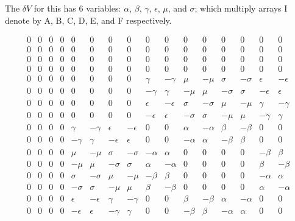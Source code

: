 \documentclass[12pt]{article}
\begin{document}
 The $\delta V$ for this has 6 variables: $\alpha$, $\beta$, $\gamma$,
$\epsilon$, $\mu$, and $\sigma$; which multiply arrays I denote by
A, B, C, D, E, and F respectively.


\begin{displaymath}
\begin{array}{cccccccccccccccc}
0 &0 &0 &0 &0 &0 &0 &0 &0 &0 &0 &0 &0 &0 &0 &0 \\
0 &0 &0 &0 &0 &0 &0 &0 &0 &0 &0 &0 &0 &0 &0 &0 \\
0 &0 &0 &0 &0 &0 &0 &0 &0 &0 &0 &0 &0 &0 &0 &0 \\
0 &0 &0 &0 &0 &0 &0 &0 &0 &0 &0 &0 &0 &0 &0 &0 \\
0 &0 &0 &0 &0 &0 &0 &0 & \gamma &-\gamma &\mu &-\mu &\sigma &-\sigma &\epsilon &-\epsilon \\
0 &0 &0 &0 &0 &0 &0 &0 & -\gamma &\gamma &-\mu &\mu &-\sigma &\sigma &-\epsilon &\epsilon \\
0 &0 &0 &0 &0 &0 &0 &0 &\epsilon &-\epsilon &\sigma &-\sigma &\mu &-\mu &\gamma &-\gamma \\
0 &0 &0 &0 &0 &0 &0 &0 &-\epsilon &\epsilon &-\sigma &\sigma &-\mu &\mu &-\gamma &\gamma \\
0 &0 &0 &0 &\gamma &-\gamma &\epsilon &-\epsilon &0 &0 &\alpha &-\alpha &\beta &-\beta &0 &0 \\
0 &0 &0 &0 &-\gamma &\gamma &-\epsilon &\epsilon &0 &0 &-\alpha &\alpha &-\beta &\beta &0 &0 \\
0 &0 &0 &0 &\mu &-\mu &\sigma &-\sigma &-\alpha &\alpha &0 &0 &0 &0 &-\beta &\beta \\
0 &0 &0 &0 &-\mu &\mu &-\sigma &\sigma &\alpha &-\alpha &0 &0 &0 &0 &\beta &-\beta \\
0 &0 &0 &0 &\sigma &-\sigma &\mu &-\mu &-\beta &\beta &0 &0 &0 &0 &-\alpha &\alpha \\
0 &0 &0 &0 &-\sigma &\sigma &-\mu &\mu &\beta &-\beta &0 &0 &0 &0 &\alpha &-\alpha \\
0 &0 &0 &0 &\epsilon &-\epsilon &\gamma &-\gamma &0 &0 &\beta &-\beta &\alpha &-\alpha &0 &0\\
0 &0 &0 &0 &-\epsilon &\epsilon &-\gamma &\gamma &0 &0 &-\beta &\beta &-\alpha &\alpha &0 &0
\end{array}
\end{displaymath}
\end{document}
